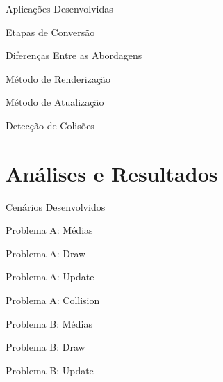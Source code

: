 \documentclass{beamer}
\begin{document}
\begin{frame}[t]{Aplicações Desenvolvidas}
\end{frame}

\begin{frame}[t]{Etapas de Conversão}
\end{frame}

\begin{frame}[t]{Diferenças Entre as Abordagens}
\end{frame}

\begin{frame}[t]{Método de Renderização}
\end{frame}

\begin{frame}[t]{Método de Atualização}
\end{frame}

\begin{frame}[t]{Detecção de Colisões}
\end{frame}

\section{Análises e Resultados}

\frame{\tableofcontents[currentsection]}

\begin{frame}[t]{Cenários Desenvolvidos}
\end{frame}

\begin{frame}[t]{Problema A: Médias}
\end{frame}

\begin{frame}[t]{Problema A: Draw}
\end{frame}

\begin{frame}[t]{Problema A: Update}
\end{frame}

\begin{frame}[t]{Problema A: Collision}
\end{frame}

\begin{frame}[t]{Problema B: Médias}
\end{frame}

\begin{frame}[t]{Problema B: Draw}
\end{frame}

\begin{frame}[t]{Problema B: Update}
\end{frame}
\end{document}
